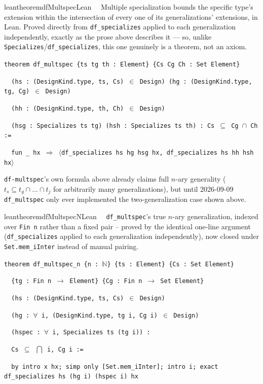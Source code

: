 \begin{restatable}{leantheorem}{dfMultspecLean}~~ Multiple specialization bounds the
specific type's extension within the intersection of every one of its generalizations' extensions, in Lean.
Proved directly from \texttt{df\_specializes} applied to each generalization independently, exactly as the
prose above describes it --- so, unlike \texttt{Specializes}/\texttt{df\_specializes}, this one genuinely is a
theorem, not an axiom.

\texttt{\textcolor{leancolor}{theorem} \textcolor{leanyellow}{df\_multspec} \{ts tg th : Element\} \{Cs Cg Ch : Set Element\}}

\texttt{~~(hs : (DesignKind.type, ts, Cs) $\in$ Design) (hg : (DesignKind.type, tg, Cg) $\in$ Design)}

\texttt{~~(hh : (DesignKind.type, th, Ch) $\in$ Design)}

\texttt{~~(hsg : Specializes ts tg) (hsh : Specializes ts th) : Cs $\subseteq$ Cg $\cap$ Ch :=}

\texttt{~~fun \_ hx $\Rightarrow$ $\langle$df\_specializes hs hg hsg hx, df\_specializes hs hh hsh hx$\rangle$}
\label{df_multspec}
\end{restatable}

\pn \texttt{df-multspec}'s own formula above already claims full $n$-ary generality ($t_s \subseteq
t_g \cap \ldots \cap t_j$ for arbitrarily many generalizations), but until 2026-09-09
\texttt{df\_multspec} only ever implemented the two-generalization case shown above.

\begin{restatable}{leantheorem}{dfMultspecNLean}~~ \texttt{df\_multspec}'s
true $n$-ary generalization, indexed over \texttt{Fin n} rather than a fixed pair -- proved by the
identical one-line argument (\texttt{df\_specializes} applied to each generalization independently),
now closed under \texttt{Set.mem\_iInter} instead of manual pairing.

\texttt{\textcolor{leancolor}{theorem} \textcolor{leanyellow}{df\_multspec\_n} \{n : $\mathbb{N}$\} \{ts : Element\} \{Cs : Set Element\}}

\texttt{~~\{tg : Fin n $\to$ Element\} \{Cg : Fin n $\to$ Set Element\}}

\texttt{~~(hs : (DesignKind.type, ts, Cs) $\in$ Design)}

\texttt{~~(hg : $\forall$ i, (DesignKind.type, tg i, Cg i) $\in$ Design)}

\texttt{~~(hspec : $\forall$ i, Specializes ts (tg i)) :}

\texttt{~~Cs $\subseteq$ $\bigcap$ i, Cg i :=}

\texttt{~~by intro x hx; simp only [Set.mem\_iInter]; intro i; exact df\_specializes hs (hg i) (hspec i) hx}
\label{df_multspec_n}
\end{restatable}

